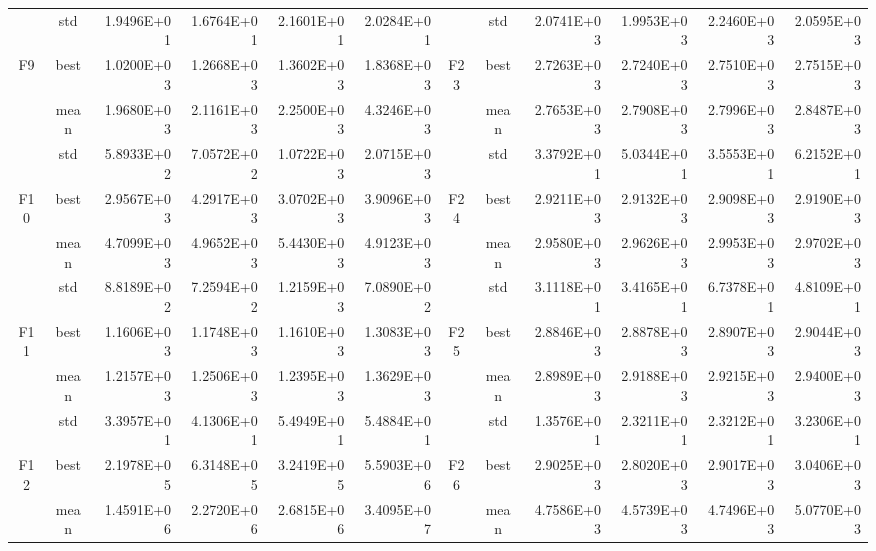 \documentclass{wzuthesis}
\begin{document}
\begin{table}[htbp]
\begin{tabular}{rrrrrrccrrrr}
          & \multicolumn{1}{c}{std} & 1.9496E+01 & 1.6764E+01 & 2.1601E+01 & 2.0284E+01 &       & std   & 2.0741E+03 & 1.9953E+03 & 2.2460E+03 & 2.0595E+03 \\
    \multicolumn{1}{c}{\multirow{3}[0]{*}{F9}} & \multicolumn{1}{c}{best} & 1.0200E+03 & 1.2668E+03 & 1.3602E+03 & 1.8368E+03 & \multirow{3}[0]{*}{F23} & best  & 2.7263E+03 & 2.7240E+03 & 2.7510E+03 & 2.7515E+03 \\
          & \multicolumn{1}{c}{mean} & 1.9680E+03 & 2.1161E+03 & 2.2500E+03 & 4.3246E+03 &       & mean  & 2.7653E+03 & 2.7908E+03 & 2.7996E+03 & 2.8487E+03 \\
          & \multicolumn{1}{c}{std} & 5.8933E+02 & 7.0572E+02 & 1.0722E+03 & 2.0715E+03 &       & std   & 3.3792E+01 & 5.0344E+01 & 3.5553E+01 & 6.2152E+01 \\
    \multicolumn{1}{c}{\multirow{3}[0]{*}{F10}} & \multicolumn{1}{c}{best} & 2.9567E+03 & 4.2917E+03 & 3.0702E+03 & 3.9096E+03 & \multirow{3}[0]{*}{F24} & best  & 2.9211E+03 & 2.9132E+03 & 2.9098E+03 & 2.9190E+03 \\
          & \multicolumn{1}{c}{mean} & 4.7099E+03 & 4.9652E+03 & 5.4430E+03 & 4.9123E+03 &       & mean  & 2.9580E+03 & 2.9626E+03 & 2.9953E+03 & 2.9702E+03 \\
          & \multicolumn{1}{c}{std} & 8.8189E+02 & 7.2594E+02 & 1.2159E+03 & 7.0890E+02 &       & std   & 3.1118E+01 & 3.4165E+01 & 6.7378E+01 & 4.8109E+01 \\
    \multicolumn{1}{c}{\multirow{3}[0]{*}{F11}} & \multicolumn{1}{c}{best} & 1.1606E+03 & 1.1748E+03 & 1.1610E+03 & 1.3083E+03 & \multirow{3}[0]{*}{F25} & best  & 2.8846E+03 & 2.8878E+03 & 2.8907E+03 & 2.9044E+03 \\
          & \multicolumn{1}{c}{mean} & 1.2157E+03 & 1.2506E+03 & 1.2395E+03 & 1.3629E+03 &       & mean  & 2.8989E+03 & 2.9188E+03 & 2.9215E+03 & 2.9400E+03 \\
          & \multicolumn{1}{c}{std} & 3.3957E+01 & 4.1306E+01 & 5.4949E+01 & 5.4884E+01 &       & std   & 1.3576E+01 & 2.3211E+01 & 2.3212E+01 & 3.2306E+01 \\
    \multicolumn{1}{c}{\multirow{3}[0]{*}{F12}} & \multicolumn{1}{c}{best} & 2.1978E+05 & 6.3148E+05 & 3.2419E+05 & 5.5903E+06 & \multirow{3}[0]{*}{F26} & best  & 2.9025E+03 & 2.8020E+03 & 2.9017E+03 & 3.0406E+03 \\
          & \multicolumn{1}{c}{mean} & 1.4591E+06 & 2.2720E+06 & 2.6815E+06 & 3.4095E+07 &       & mean  & 4.7586E+03 & 4.5739E+03 & 4.7496E+03 & 5.0770E+03 \\

\end{tabular}
\end{table}
\end{document}
